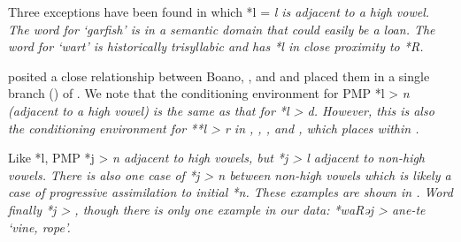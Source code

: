 Three exceptions have been found in which *l = \it{l} is adjacent
to a high vowel.
The word for ‘garfish’ is in a semantic domain that could easily be a loan.
The word for ‘wart’ is historically trisyllabic
and has *l in close proximity to *R.


\citet[69]{Collins1983} posited a close relationship between
Boano, , and  and placed them in a single branch () of .
We note that the conditioning environment for PMP *l > \it{n}
(adjacent to a high vowel) is the same as that for  *l > \it{d}.
However, this is also the conditioning environment for **l >
\it{r} in , , , and , which \citet[100]{Collins1983}
places within .

Like *l, PMP *j > \it{n} adjacent to high vowels,
but *j > \it{l} adjacent to non-high vowels.
There is also one case of *j > \it{n} between non-high vowels
which is likely a case of progressive assimilation to initial *n.
These examples are shown in .
Word finally *j > {\0},
though there is only one example in our data: *waRəj > \it{ane-te}
‘vine, rope’.

